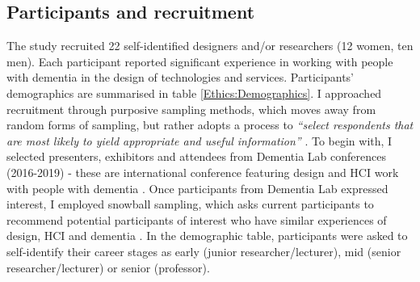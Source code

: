 \subsection{Participants and recruitment}
\label{Ethics:Participants}
The study recruited 22 self-identified designers and/or researchers (12 women, ten men). Each participant reported significant experience in working with people with dementia in the design of technologies and services. Participants' demographics are summarised in table \ref{Ethics:Demographics}. I approached recruitment through purposive sampling methods, which moves away from random forms of sampling, but rather adopts a process to \textit{``select respondents that are most likely to yield appropriate and useful information''} \citep[pg.317]{kelly2010qualitative}. To begin with, I selected presenters, exhibitors and attendees from Dementia Lab conferences (2016-2019) - these are international conference featuring design and HCI work with people with dementia \citep{brankaert_dementia_2019}. Once participants from Dementia Lab expressed interest, I employed snowball sampling, which asks current participants to recommend potential participants of interest who have similar experiences of design, HCI and dementia \citep{noy_sampling_2008}. In the demographic table, participants were asked to self-identify their career stages as early (junior researcher/lecturer), mid (senior researcher/lecturer) or senior (professor).

